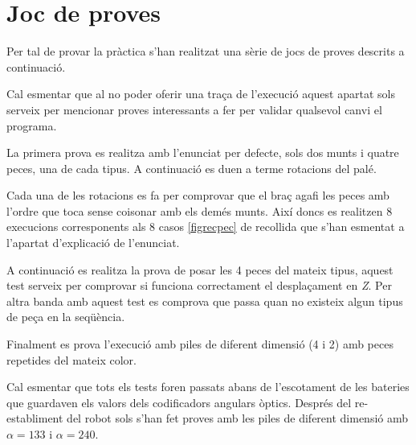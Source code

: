 \section{Joc de proves}

Per tal de provar la pràctica s'han realitzat una sèrie de jocs de proves
descrits a continuació.

Cal esmentar que al no poder oferir una traça de l'execució
aquest apartat sols serveix per mencionar proves interessants a fer
per validar qualsevol canvi el programa.

La primera prova es realitza amb l'enunciat per defecte, sols dos munts i
quatre peces, una de cada tipus. A continuació es duen a terme rotacions
del palé.

Cada una de les rotacions es fa per comprovar que el braç agafi les
peces amb l'ordre que toca sense co\lgem isonar amb els demés munts.
Així doncs es realitzen 8 execucions corresponents als 8 casos
\ref{figrecpec} de recollida que s'han esmentat a l'apartat
d'explicació de l'enunciat.

A continuació es realitza la prova de posar les 4 peces del mateix tipus,
aquest test serveix per comprovar si funciona correctament el desplaçament
en \emph{Z}. Per altra banda amb aquest test es comprova que passa
quan no existeix algun tipus de peça en la seqüència.

Finalment es prova l'execució amb piles de diferent dimensió (4 i 2)
amb peces repetides del mateix color.

Cal esmentar que tots els tests foren passats abans de l'escotament
de les bateries que guardaven els valors dels codificadors angulars
òptics. Després del re-establiment del robot sols s'han fet proves
amb les piles de diferent dimensió amb $\alpha = 133$ i $\alpha = 240$.